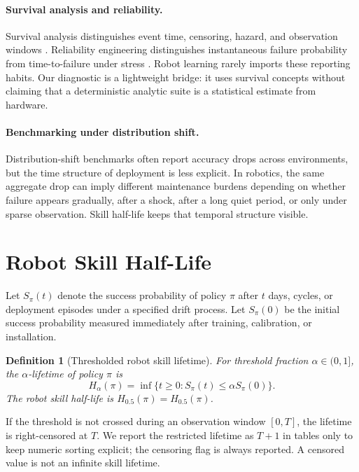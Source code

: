 \documentclass{article}
\newtheorem{definition}{Definition}
\newcommand{\half}{H_{0.5}}
\newcommand{\life}[1]{H_{#1}}
\begin{document}
\paragraph{Survival analysis and reliability.}
Survival analysis distinguishes event time, censoring, hazard, and observation
windows \citep{kaplan1958nonparametric,cox1972regression,kleinbaum2012survival}.
Reliability engineering distinguishes instantaneous failure probability from
time-to-failure under stress \citep{meeker1998statistical}. Robot learning rarely
imports these reporting habits. Our diagnostic is a lightweight bridge: it uses
survival concepts without claiming that a deterministic analytic suite is a
statistical estimate from hardware.

\paragraph{Benchmarking under distribution shift.}
Distribution-shift benchmarks often report accuracy drops across environments,
but the time structure of deployment is less explicit. In robotics, the same
aggregate drop can imply different maintenance burdens depending on whether
failure appears gradually, after a shock, after a long quiet period, or only
under sparse observation. Skill half-life keeps that temporal structure visible.

\section{Robot Skill Half-Life}

Let $S_\pi(t)$ denote the success probability of policy $\pi$ after $t$ days,
cycles, or deployment episodes under a specified drift process. Let $S_\pi(0)$
be the initial success probability measured immediately after training,
calibration, or installation.

\begin{definition}[Thresholded robot skill lifetime]
For threshold fraction $\alpha \in (0,1]$, the $\alpha$-lifetime of policy
$\pi$ is
\[
\life{\alpha}(\pi) = \inf \{ t \geq 0 : S_\pi(t) \leq \alpha S_\pi(0) \}.
\]
The robot skill half-life is $\half(\pi)=\life{0.5}(\pi)$.
\end{definition}

If the threshold is not crossed during an observation window $[0,T]$, the
lifetime is right-censored at $T$. We report the restricted lifetime as $T+1$
in tables only to keep numeric sorting explicit; the censoring flag is always
reported. A censored value is not an infinite skill lifetime.
\end{document}
